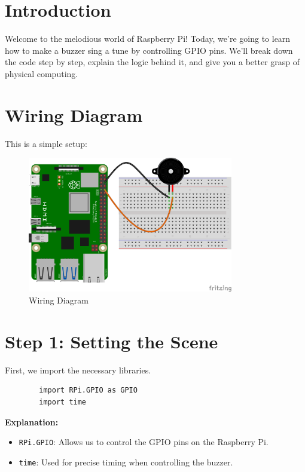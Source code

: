 \documentclass{article}
\begin{document}
	\section*{Introduction}
	Welcome to the melodious world of Raspberry Pi! Today, we’re going to learn how to make a buzzer sing a tune by controlling GPIO pins. We'll break down the code step by step, explain the logic behind it, and give you a better grasp of physical computing.
	
	\section*{Wiring Diagram}
	This is a simple setup:
	
	\begin{figure}[H]
		\centering
		\includegraphics[width=0.8\textwidth]{piezo-buzzer-wiring_bb.png} %
		\caption{Wiring Diagram}
	\end{figure}
	
	\section*{Step 1: Setting the Scene}
	First, we import the necessary libraries. 
	
	\begin{lstlisting}
		import RPi.GPIO as GPIO
		import time
	\end{lstlisting}
	
	\textbf{Explanation:}
	\begin{itemize}
		\item \texttt{RPi.GPIO}: Allows us to control the GPIO pins on the Raspberry Pi.
		\item \texttt{time}: Used for precise timing when controlling the buzzer.
	\end{itemize}
	
\end{document}
